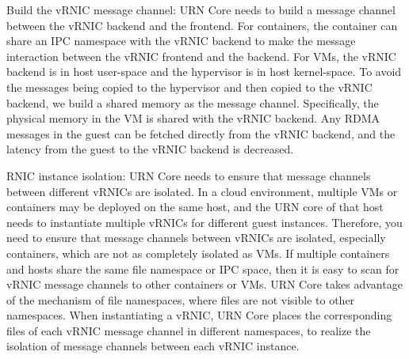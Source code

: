 Build the vRNIC message channel: URN Core needs to build a message channel between the vRNIC backend and the frontend. For containers, the container can share an IPC namespace with the vRNIC backend to make the message interaction between the vRNIC frontend and the backend. For VMs, the vRNIC backend is in host user-space and the hypervisor is in host kernel-space. To avoid the messages being copied to the hypervisor and then copied to the vRNIC backend, we build a shared memory as the message channel. Specifically, the physical memory in the VM is shared with the vRNIC backend. Any RDMA messages in the guest can be fetched directly from the vRNIC backend, and the latency from the guest to the vRNIC backend is decreased.

RNIC instance isolation: URN Core needs to ensure that message channels between different vRNICs are isolated. In a cloud environment, multiple VMs or containers may be deployed on the same host, and the URN core of that host needs to instantiate multiple vRNICs for different guest instances. Therefore, you need to ensure that message channels between vRNICs are isolated, especially containers, which are not as completely isolated as VMs. If multiple containers and hosts share the same file namespace or IPC space, then it is easy to scan for vRNIC message channels to other containers or VMs. URN Core takes advantage of the mechanism of file namespaces, where files are not visible to other namespaces. When instantiating a vRNIC, URN Core places the corresponding files of each vRNIC message channel in different namespaces, to realize the isolation of message channels between each vRNIC instance.

